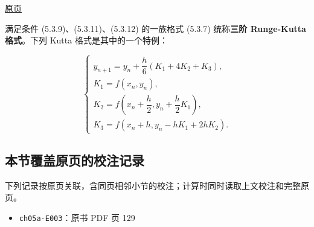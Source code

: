 \documentclass[
  10pt,
  fontset=fandol]{ctexart}
\providecommand{\tightlist}{%
  \setlength{\itemsep}{0pt}\setlength{\parskip}{0pt}}
\begin{document}
\href{../../source-images/pdf-131.jpeg}{原页}

满足条件 (5.3.9)、(5.3.11)、(5.3.12) 的一族格式 (5.3.7) 统称\textbf{三阶 Runge-Kutta 格式}。下列 Kutta 格式是其中的一个特例：

\[
\begin{cases}
y_{n+1}=y_n+\dfrac{h}{6}(K_1+4K_2+K_3),\\
K_1=f(x_n,y_n),\\
K_2=f\left(x_n+\dfrac{h}{2},y_n+\dfrac{h}{2}K_1\right),\\
K_3=f(x_n+h,y_n-hK_1+2hK_2).
\end{cases}
\]

\subsection{本节覆盖原页的校注记录}\label{ux672cux8282ux8986ux76d6ux539fux9875ux7684ux6821ux6ce8ux8bb0ux5f55}

下列记录按原页关联，含同页相邻小节的校注；计算时同时读取上文校注和完整原页。

\begin{itemize}
\tightlist
\item
  \texttt{ch05a-E003}：原书 PDF 页 129
\end{itemize}
\end{document}

